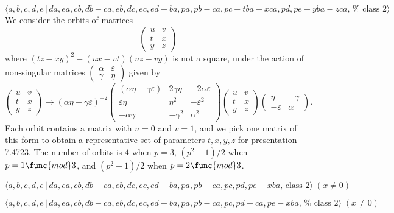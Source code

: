 \documentclass[10pt]{article}
\begin{document}
\begin{equation}
\langle
a,b,c,d,e\,|%
\,da,ea,cb,db-ca,eb,dc,ec,ed-ba,pa,pb-ca,pc-tba-xca,pd,pe-yba-zca,\,\text{%
class }2\rangle  \tag{7.4723}
\end{equation}%
We consider the orbits of matrices 
\[
\left( 
\begin{array}{ll}
u & v \\ 
t & x \\ 
y & z%
\end{array}%
\right) 
\]%
where $(tz-xy)^{2}-(ux-vt)(uz-vy)$ is not a square, under the action of
non-singular matrices $\left( 
\begin{array}{ll}
\alpha & \varepsilon \\ 
\gamma & \eta%
\end{array}%
\right) $ given by 
\[
\left( 
\begin{array}{ll}
u & v \\ 
t & x \\ 
y & z%
\end{array}%
\right) \rightarrow (\alpha \eta -\gamma \varepsilon )^{-2}\left( 
\begin{array}{lll}
(\alpha \eta +\gamma \varepsilon ) & 2\gamma \eta & -2\alpha \varepsilon \\ 
\varepsilon \eta & \eta ^{2} & -\varepsilon ^{2} \\ 
-\alpha \gamma & -\gamma ^{2} & \alpha ^{2}%
\end{array}%
\right) \left( 
\begin{array}{ll}
u & v \\ 
t & x \\ 
y & z%
\end{array}%
\right) \left( 
\begin{array}{ll}
\eta & -\gamma \\ 
-\varepsilon & \alpha%
\end{array}%
\right) . 
\]%
Each orbit contains a matrix with $u=0$ and $v=1$, and we pick one matrix of
this form to obtain a representative set of parameters $t,x,y,z$ for
presentation 7.4723. The number of orbits is $4$ when $p=3$, $(p^{2}-1)/2$
when $p=1\func{mod}3$, and $(p^{2}+1)/2$ when $p=2\func{mod}3$.

\begin{equation}
\langle a,b,c,d,e\,|\,da,ea,cb,db-ca,eb,dc,ec,ed-ba,pa,pb-ca,pc,pd,pe-xba,\,%
\text{class }2\rangle \;(x \neq 0)  \tag{7.4724}
\end{equation}

\begin{equation}
\langle
a,b,c,d,e\,|\,da,ea,cb,db-ca,eb,dc,ec,ed-ba,pa,pb-ca,pc,pd-ca,pe-xba,\,\text{%
class }2\rangle \;(x \neq 0)  \tag{7.4725}
\end{equation}
\end{document}
